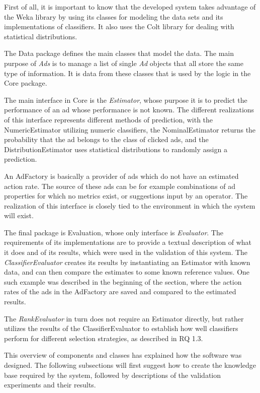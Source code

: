\documentclass{sig-alternate}
\begin{document}
First of all, it is important to know that the developed system takes advantage of the Weka library by using its classes for modeling the data sets and its implementations of classifiers. It also uses the Colt library for dealing with statistical distributions.

The Data package defines the main classes that model the data. The main purpose of \textit{Ads} is to manage a list of single \textit{Ad} objects that all store the same type of information. It is data from these classes that is used by the logic in the Core package.

The main interface in Core is the \textit{Estimator}, whose purpose it is to predict the performance of an ad whose performance is not known. The different realizations of this interface represents different methods of prediction, with the NumericEstimator utilizing numeric classifiers, the NominalEstimator returns the probability that the ad belongs to the class of clicked ads, and the DistributionEstimator uses statistical distributions to randomly assign a prediction.

An AdFactory is basically a provider of ads which do not have an estimated action rate. The source of these ads can be for example combinations of ad properties for which no metrics exist, or suggestions input by an operator. The realization of this interface is closely tied to the environment in which the system will exist.

The final package is Evaluation, whose only interface is \textit{Evaluator}. The requirements of its implementations are to provide a textual description of what it does and of its results, which were used in the validation of this system. The \textit{ClassifierEvaluator} creates its results by instantiating an Estimator with known data, and can then compare the estimates to some known reference values. One such example was described in the beginning of the section, where the action rates of the ads in the AdFactory are saved and compared to the estimated results.

The \textit{RankEvaluator} in turn does not require an Estimator directly, but rather utilizes the results of the ClassifierEvaluator to establish how well classifiers perform for different selection strategies, as described in RQ 1.3.

This overview of components and classes has explained how the software was designed. The following subsections will first suggest how to create the knowledge base required by the system, followed by descriptions of the validation experiments and their results.
\end{document}
